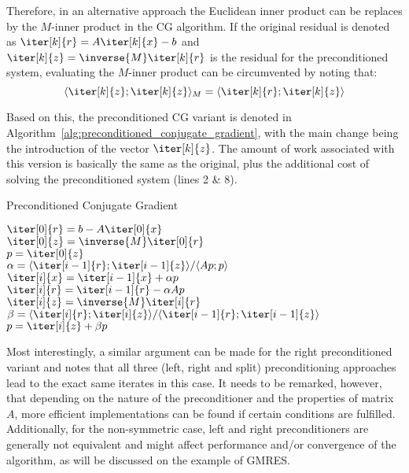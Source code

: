 \noindent Therefore, in an alternative approach the Euclidean inner product can be replaces by the $M$-inner product in the CG algorithm. If the original residual is denoted as $\iter[k]{r}=A\iter[k]{x}-b$ and $\iter[k]{z}=\inverse{M}\iter[k]{r}$ is the residual for the preconditioned system, evaluating the $M$-inner product can be circumvented by noting that:
\begin{equation}
    \langle \iter[k]{z};\iter[k]{z} \rangle_M = \langle \iter[k]{r};\iter[k]{z} \rangle
\end{equation}

\noindent Based on this, the preconditioned CG variant is denoted in Algorithm~\hyperref[alg:preconditioned_conjugate_gradient]{\ref{alg:preconditioned_conjugate_gradient}}, with the main change being the introduction of the vector $\iter[k]{z}$. The amount of work associated with this version is basically the same as the original, plus the additional cost of solving the preconditioned system (lines 2 \& 8).

\begin{algorithm}[h]
  \caption{Preconditioned Conjugate Gradient}
  \label{alg:preconditioned_conjugate_gradient}
  \SetAlgoLined
  \DontPrintSemicolon
  $\iter[0]{r} = b-A\iter[0]{x}$ \\
  $\iter[0]{z} = \inverse{M}\iter[0]{r}$ \\
  $p = \iter[0]{z}$ \\
   {
    $\alpha = \langle \iter[i-1]{r};\iter[i-1]{z} \rangle / \langle Ap;p \rangle$ \\
    $\iter[i]{x} = \iter[i-1]{x}+\alpha p$ \\
    $\iter[i]{r} = \iter[i-1]{r} - \alpha Ap$ \\
    $\iter[i]{z} = \inverse{M}\iter[i]{r}$ \\
    $\beta = \langle \iter[i]{r};\iter[i]{z} \rangle / \langle \iter[i-1]{r};\iter[i-1]{z} \rangle$ \\
    $p = \iter[i]{z} + \beta p$ \\
  }
\end{algorithm}

Most interestingly, a similar argument can be made for the right preconditioned variant and \cite{saad_iterative_2003} notes that all three (left, right and split) preconditioning approaches lead to the exact same iterates in this case. It needs to be remarked, however, that depending on the nature of the preconditioner and the properties of matrix $A$, more efficient implementations can be found if certain conditions are fulfilled. Additionally, for the non-symmetric case, left and right preconditioners are generally not equivalent and might affect performance and/or convergence of the algorithm, as will be discussed on the example of GMRES.

